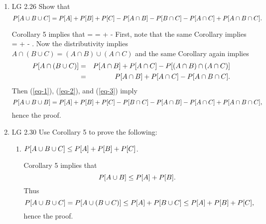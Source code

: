 \begin{enumerate}
	\item LG 2.26
	\ifdefined\sol
	Show that
	\[
		P[A\cup B\cup C]
		= P[A] + P[B] + P[C]
		-P[A\cap B] -P[B\cap C] -P[A\cap C]
		+P[A\cap B\cap C].
	\]
	\begin{solution}
		Corollary 5 implies that
			= 
			=  +  - 
		\eeql
		First, note that the same Corollary implies
			 =  +  - .
		\eeql
		Now the distributivity implies
		$A\cap (B\cup C) = (A\cap B) \cup (A\cap C)$
		and the same Corollary again implies
		\begin{eqnarray}
			\nonumber
			P[A\cap (B\cup C)]
			&=& P[A\cap B] + P[A\cap C]
			- P[(A\cap B)\cap( A\cap C)]
			\\ &=& P[A\cap B] + P[A\cap C] - P[A\cap B\cap C].
			\label{eq-3}
		\end{eqnarray}
		Then (\ref{eq-1}), (\ref{eq-2}), and (\ref{eq-3}) imply
		\[
			P[A\cup B\cup B]
			= P[A] + P[B] + P[C] - P[B\cap C]
			- P[A\cap B] - P[A\cap C] + P[A\cap B\cap C],
		\]
		hence the proof.
	\end{solution}

	\fi

	\item LG 2.30
	\ifdefined\sol
	Use Corollary 5 to prove the following:
	\begin{enumerate}
		\item $P[A\cup B\cup C] \leq P[A] + P[B] + P[C]$.
		\begin{solution}
			Corollary 5 implies that
			\[
				P[A\cup B] \leq P[A] + P[B].
			\]
			Thus
			\[
				P[A\cup B\cup C]
				= P[A\cup (B\cup C)]
				\leq P[A] + P[B\cup C]
				\leq P[A] + P[B] + P[C],
			\]
			hence the proof.
		\end{solution}


\end{enumerate}
\end{enumerate}
